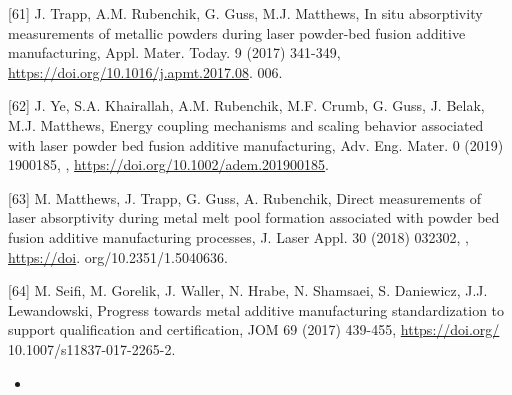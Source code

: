 \documentclass[10pt]{article}
\begin{document}
[61] J. Trapp, A.M. Rubenchik, G. Guss, M.J. Matthews, In situ absorptivity measurements of metallic powders during laser powder-bed fusion additive manufacturing, Appl. Mater. Today. 9 (2017) 341-349, \href{https://doi.org/10.1016/j.apmt.2017.08}{https://doi.org/10.1016/j.apmt.2017.08}. 006.

[62] J. Ye, S.A. Khairallah, A.M. Rubenchik, M.F. Crumb, G. Guss, J. Belak, M.J. Matthews, Energy coupling mechanisms and scaling behavior associated with laser powder bed fusion additive manufacturing, Adv. Eng. Mater. 0 (2019) 1900185, , \href{https://doi.org/10.1002/adem.201900185}{https://doi.org/10.1002/adem.201900185}.

[63] M. Matthews, J. Trapp, G. Guss, A. Rubenchik, Direct measurements of laser absorptivity during metal melt pool formation associated with powder bed fusion additive manufacturing processes, J. Laser Appl. 30 (2018) 032302, , \href{https://doi}{https://doi}. org/10.2351/1.5040636.

[64] M. Seifi, M. Gorelik, J. Waller, N. Hrabe, N. Shamsaei, S. Daniewicz, J.J. Lewandowski, Progress towards metal additive manufacturing standardization to support qualification and certification, JOM 69 (2017) 439-455, \href{https://doi.org/}{https://doi.org/} 10.1007/s11837-017-2265-2.

\begin{itemize}
  \item 
\end{itemize}
\end{document}
